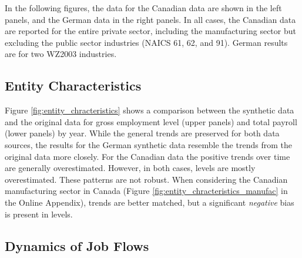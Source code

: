 
\newcommand{\CanTableNote}{$LEAP$ is the Longitudinal Employment Analysis Program and $CanSynLBD$ is the Canadian synthetic database based on LEAP. }

In the following figures, the data for the Canadian data are shown in the left panels, and the German data in the right panels. In all cases, the Canadian data are reported for the entire private sector,  including the manufacturing sector but excluding  the public sector industries (NAICS 61, 62, and 91). German results are for two WZ2003 industries.

\subsection{Entity Characteristics}



Figure \ref{fig:entity_chracteristics} shows a comparison between the synthetic data and the original data for gross employment level (upper panels) and total payroll (lower panels) by year. While the general trends are preserved for both data sources, the results for the German synthetic data resemble the trends from the original data more closely. For the Canadian data the positive trends over time are generally overestimated. However, in both cases, levels are mostly overestimated. These patterns are not robust. When considering the Canadian  manufacturing sector in Canada (Figure \ref{fig:entity_chracteristics_manufac} in the Online Appendix), trends are better matched, but a significant \textit{negative} bias is present in levels.



\subsection{Dynamics of Job Flows}



